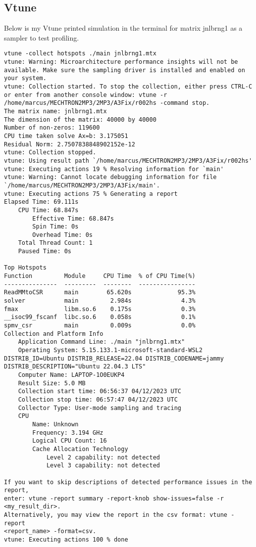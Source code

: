 \documentclass[12pt]{article}
\begin{document}
\subsection{Vtune}

Below is my Vtune printed simulation in the terminal for matrix jnlbrng1 as a sampler to test profiling.

\begin{lstlisting}
vtune -collect hotspots ./main jnlbrng1.mtx
vtune: Warning: Microarchitecture performance insights will not be available. Make sure the sampling driver is installed and enabled on your system.
vtune: Collection started. To stop the collection, either press CTRL-C or enter from another console window: vtune -r /home/marcus/MECHTRON2MP3/2MP3/A3Fix/r002hs -command stop.
The matrix name: jnlbrng1.mtx
The dimension of the matrix: 40000 by 40000
Number of non-zeros: 119600
CPU time taken solve Ax=b: 3.175051
Residual Norm: 2.7507838848902152e-12
vtune: Collection stopped.
vtune: Using result path `/home/marcus/MECHTRON2MP3/2MP3/A3Fix/r002hs'
vtune: Executing actions 19 % Resolving information for `main'                 
vtune: Warning: Cannot locate debugging information for file `/home/marcus/MECHTRON2MP3/2MP3/A3Fix/main'.
vtune: Executing actions 75 % Generating a report                              Elapsed Time: 69.111s
    CPU Time: 68.847s
        Effective Time: 68.847s
        Spin Time: 0s
        Overhead Time: 0s
    Total Thread Count: 1
    Paused Time: 0s

Top Hotspots
Function         Module     CPU Time  % of CPU Time(%)
---------------  ---------  --------  ----------------
ReadMMtoCSR      main        65.620s             95.3%
solver           main         2.984s              4.3%
fmax             libm.so.6    0.175s              0.3%
__isoc99_fscanf  libc.so.6    0.058s              0.1%
spmv_csr         main         0.009s              0.0%
Collection and Platform Info
    Application Command Line: ./main "jnlbrng1.mtx" 
    Operating System: 5.15.133.1-microsoft-standard-WSL2 DISTRIB_ID=Ubuntu DISTRIB_RELEASE=22.04 DISTRIB_CODENAME=jammy DISTRIB_DESCRIPTION="Ubuntu 22.04.3 LTS"
    Computer Name: LAPTOP-1O0EUKP4
    Result Size: 5.0 MB 
    Collection start time: 06:56:37 04/12/2023 UTC
    Collection stop time: 06:57:47 04/12/2023 UTC
    Collector Type: User-mode sampling and tracing
    CPU
        Name: Unknown
        Frequency: 3.194 GHz
        Logical CPU Count: 16
        Cache Allocation Technology
            Level 2 capability: not detected
            Level 3 capability: not detected

If you want to skip descriptions of detected performance issues in the report,
enter: vtune -report summary -report-knob show-issues=false -r <my_result_dir>.
Alternatively, you may view the report in the csv format: vtune -report
<report_name> -format=csv.
vtune: Executing actions 100 % done    
\end{lstlisting}
\end{document}
